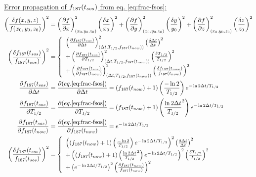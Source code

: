 \underline{Error propagation of $f_{187}(t_{sos})$ from eq. \ref{eq:frac-fsos}:}
\begin{align*}
  \left( \frac{\delta f(x,y,z)}{f(x_0, y_0, z_0)} \right)^2 &=
  \left(\pd{f}{x}\right)_{(x_0,y_0,z_0)}^2 \left( \frac{\delta x}{x_0} \right)^2
  + \left(\pd{f}{y}\right)_{(x_0,y_0,z_0)}^2 \left( \frac{\delta y}{y_0} \right)^2
  + \left(\pd{f}{z}\right)_{(x_0,y_0,z_0)}^2 \left( \frac{\delta z}{z_0} \right)^2 \\
  \left(\frac{\delta \fracfsos}{\fracfsos}\right)^2 &= \left\{
  \begin{array}{l}
    \left(\pd{\fracfsos}{\Delta t}\right)_{(\Delta t, T_{1/2}, \fracnow)}^2 \left( \frac{\delta \Delta t}{\Delta t} \right)^2 \\
    + \left(\pd{\fracfsos}{T_{1/2}}\right)_{(\Delta t, T_{1/2}, \fracnow)}^2 \left( \frac{\delta T_{1/2}}{T_{1/2}} \right)^2 \\
    + \left(\pd{\fracfsos}{\fracnow}\right)_{(\Delta t, T_{1/2}, \fracnow)}^2 \left( \frac{\delta \fracnow}{\fracnow} \right)^2
  \end{array} \right. \\
  \pd{\fracfsos}{\Delta t} &= \pd{(eq.\ref{eq:frac-fsos})}{\Delta t}
  = (\fracnow + 1) \left(\frac{-\ln 2}{T_{1/2}}\right) e^{-\ln 2 \Delta t /T_{1/2}} \\
  \pd{\fracfsos}{T_{1/2}} &= \pd{(eq.\ref{eq:frac-fsos})}{T_{1/2}}
  = (\fracnow + 1) \left(\frac{\ln 2 \Delta t}{T_{1/2}}^2\right) e^{-\ln 2 \Delta t /T_{1/2}} \\
  \pd{\fracfsos}{\fracnow} &= \pd{(eq.\ref{eq:frac-fsos})}{\fracnow}
  = e^{-\ln 2 \Delta t /T_{1/2}} \\
  \left(\frac{\delta \fracfsos}{\fracfsos}\right)^2 &= \left\{
  \begin{array}{l}
    \left( (\fracnow + 1) \left(\frac{-\ln 2}{T_{1/2}}\right) e^{-\ln 2 \Delta t /T_{1/2}}
    \right)^2%
    \left( \frac{\delta \Delta t}{\Delta t} \right)^2 \\
    + \left((\fracnow + 1) \left(\frac{\ln 2 \Delta t}{T_{1/2}}^2\right) e^{-\ln 2 \Delta t /T_{1/2}}
    \right)^2%
    \left( \frac{\delta T_{1/2}}{T_{1/2}} \right)^2 \\
    + \left(e^{-\ln 2 \Delta t /T_{1/2}}\right)^2%
    \left( \frac{\delta \fracnow}{\fracnow} \right)^2
  \end{array} \right. \\

\end{align*}
